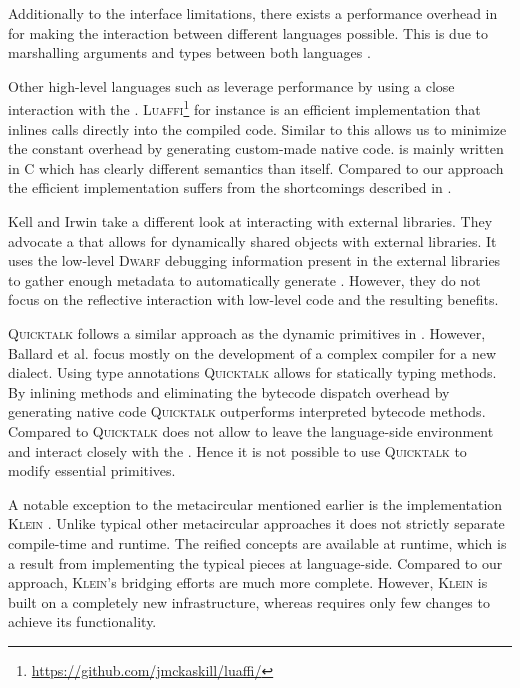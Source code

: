 Additionally to the interface limitations, there exists a performance overhead in \FFI for making the interaction between different languages possible. 
This is due to marshalling arguments and types between both languages \cite{Fish00a,Repp06b}.


Other high-level languages such as \Lua leverage \FFI performance by using a close interaction with the \JIT.
\textsc{Luaffi}\footnote{\url{https://github.com/jmckaskill/luaffi/}} for instance is an efficient \Lua implementation that inlines \FFI calls directly into the \JIT compiled code.
Similar to \B this allows us to minimize the constant overhead by generating custom-made native code.
\Luajit is mainly written in C which has clearly different semantics than \Lua itself.
Compared to our approach the efficient \VM implementation suffers from the shortcomings described in . 

Kell and Irwin \cite{Kell11a} take a different look at interacting with external libraries.
They advocate a \Python \VM that allows for dynamically shared objects with external libraries.
It uses the low-level \textsc{Dwarf} debugging information present in the external libraries to gather enough metadata to automatically generate \FFIs.
However, they do not focus on the reflective interaction with low-level code and the resulting benefits. 

\textsc{Quicktalk} \cite{Ball86a} follows a similar approach as the dynamic primitives in \WF.
However, Ballard et al. focus mostly on the development of a complex compiler for a new \ST dialect.
Using type annotations \textsc{Quicktalk} allows for statically typing methods.
By inlining methods and eliminating the bytecode dispatch overhead by generating native code \textsc{Quicktalk} outperforms interpreted bytecode methods.
Compared to \WF \textsc{Quicktalk} does not allow to leave the language-side environment and interact closely with the \VM.
Hence it is not possible to use \textsc{Quicktalk} to modify essential primitives.

A notable exception to the metacircular \VMs mentioned earlier is the \Self implementation \textsc{Klein} \cite{Unga05a}.
Unlike typical other metacircular approaches it does not strictly separate compile-time and runtime.
The reified \VM concepts are available at runtime, which is a result from implementing the typical \VM pieces at language-side.
Compared to our approach, \textsc{Klein}'s bridging efforts are much more complete.
However, \textsc{Klein} is built on a completely new \VM infrastructure, whereas \B requires only few changes to achieve its functionality.

